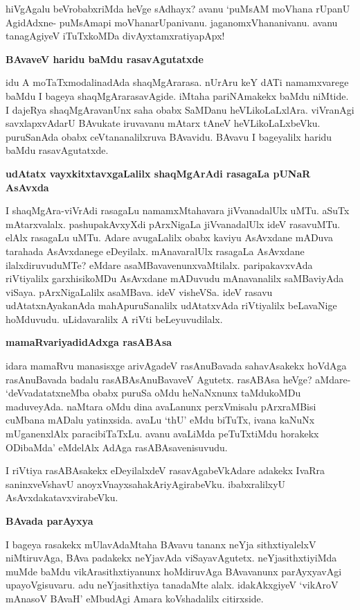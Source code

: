 hiVgAgalu beVrobabxriMda heVge sAdhayx? avanu `puMsAM moVhana rUpanU AgidAdxne- puMsA\-mapi moVhanarUpanivanu. jaganomxVhananivanu. avanu tanagAgiyeV iTuTxkoMDa divAyxtamxratiyapApx!

{\bigskip
\noindent
{\large\bf BAvaveV haridu baMdu rasavAgutatxde}}\label{page229}
\medskip

\noindent
idu A moTaTxmodalinadAda shaqMgArarasa. nUrAru keY dATi namamxvarege baMdu I bageya shaqMgAra\-rasavAgide. iMtaha pariNAmakekx baMdu niMtide. I dajeRya shaqMgAravanUnx saha obabx SaMDanu heVLikoLaLxlAra. viVranAgi savxlapxvAdarU BAvukate iruvavanu mAtarx tAneV heVLikoLaLxbeVku. puruSa\-nAda obabx ceVtananalilxruva BAvavidu. BAvavu I bageyalilx haridu baMdu rasavAgutatxde.

{\bigskip
\noindent
{\large\bf udAtatx vayxkitxtavxgaLalilx shaqMgArAdi rasagaLa pUNaR AsAvxda}}
\medskip

\noindent
I shaqMgAra-viVrAdi rasagaLu namamxMtahavara jiVvanadalUlx uMTu. aSuTx mAtarxvalalx. pashupa\-kAvxyXdi pArxNigaLa jiVvanadalUlx ideV rasavuMTu. elAlx rasagaLu uMTu. Adare avugaLalilx obabx kaviyu AsAvx\-dane mADuva tarahada AsAvxdanege eDeyilalx. mAnavaralUlx rasagaLa AsAvxdane ilalxdiruvuduMTe? eMdare asaMBavavenunxvaMtilalx. paripakavxvAda riVtiyalilx garxhisikoMDu AsAvxdane mADuvudu mAnava\-nalilx saMBaviyAda viSaya. pArxNigaLalilx asaMBava. ideV visheVSa. ideV rasavu udAtatxnAyakanAda mahA\-puruSanalilx udAtatxvAda riVtiyalilx beLavaNige hoMduvudu. uLidavaralilx A riVti beLeyuvu\-dilalx.

{\bigskip
\noindent
{\large\bf mamaRvariyadidAdxga rasABAsa}}\label{page229}
\medskip

\noindent
idara mamaRvu manasisxge arivAgadeV rasAnuBavada sahavAsakekx hoVdAga rasAnuBavada badalu rasABAsAnuBavaveV Agutetx. rasABAsa heVge? aMdare- `deVvadatatxneMba obabx puruSa oMdu heNaNxnunx taMdukoMDu maduveyAda. naMtara oMdu dina avaLanunx perxVmisalu pArxraMBisi cuMbana mADalu yatinxsida. avaLu `thU' eMdu biTuTx, ivana kaNuNx mUganenxlAlx paracibiTaTxLu. avanu avaLiMda peTuTx\-tiMdu horakekx ODibaMda' eMdelAlx AdAga rasABAsavenisuvudu.

I riVtiya rasABAsakekx eDeyilalxdeV rasavAgabeVkAdare adakekx IvaRra saninxveVshavU anoyxVnayxsaha\-kAriyAgirabeVku. ibabxralilxyU AsAvxdakatavxvirabeVku.

{\bigskip
\noindent
{\large\bf BAvada parAyxya}}\label{page230}
\medskip

\noindent
I bageya rasakekx mUlavAdaMtaha BAvavu tananx neYja sithxtiyalelxV niMtiruvAga, BAva padakekx neYja\-vAda viSayavAgutetx. neYjasithxtiyiMda muMde baMdu vikArasithxtiyanunx hoMdiruvAga BAva\-vanunx parAyxyavAgi upayoVgisuvaru. adu neYjasithxtiya tanadaMte alalx. idakAkxgiyeV `vikAroV mAna\-soV BAvaH'\label{230} eMbudAgi Amara koVshadalilx citirxside.

